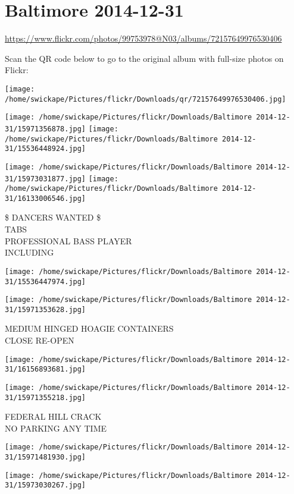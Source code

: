 \documentclass[10pt,letterpaper]{article}
\title{}
\author{}
\date{}
\begin{document}
\section*{Baltimore 2014-12-31}

\url{https://www.flickr.com/photos/99753978@N03/albums/72157649976530406}

Scan the QR code below to go to the original album with full-size photos on Flickr:

\texttt{[image: /home/swickape/Pictures/flickr/Downloads/qr/72157649976530406.jpg]}
\pagebreak

\texttt{[image: /home/swickape/Pictures/flickr/Downloads/Baltimore 2014-12-31/15971356878.jpg]}
\texttt{[image: /home/swickape/Pictures/flickr/Downloads/Baltimore 2014-12-31/15536448924.jpg]}

\texttt{[image: /home/swickape/Pictures/flickr/Downloads/Baltimore 2014-12-31/15973031877.jpg]}
\texttt{[image: /home/swickape/Pictures/flickr/Downloads/Baltimore 2014-12-31/16133006546.jpg]}

\$ DANCERS WANTED \$\\
TABS\\
PROFESSIONAL BASS PLAYER\\
INCLUDING
\pagebreak

\texttt{[image: /home/swickape/Pictures/flickr/Downloads/Baltimore 2014-12-31/15536447974.jpg]}

\vspace{0.25in}
\texttt{[image: /home/swickape/Pictures/flickr/Downloads/Baltimore 2014-12-31/15971353628.jpg]}

MEDIUM HINGED HOAGIE CONTAINERS\\
CLOSE RE{-}OPEN
\pagebreak

\texttt{[image: /home/swickape/Pictures/flickr/Downloads/Baltimore 2014-12-31/16156893681.jpg]}

\vspace{0.25in}
\texttt{[image: /home/swickape/Pictures/flickr/Downloads/Baltimore 2014-12-31/15971355218.jpg]}

FEDERAL HILL CRACK\\
NO PARKING ANY TIME
\pagebreak

\texttt{[image: /home/swickape/Pictures/flickr/Downloads/Baltimore 2014-12-31/15971481930.jpg]}

\vspace{0.25in}
\texttt{[image: /home/swickape/Pictures/flickr/Downloads/Baltimore 2014-12-31/15973030267.jpg]}
\end{document}
